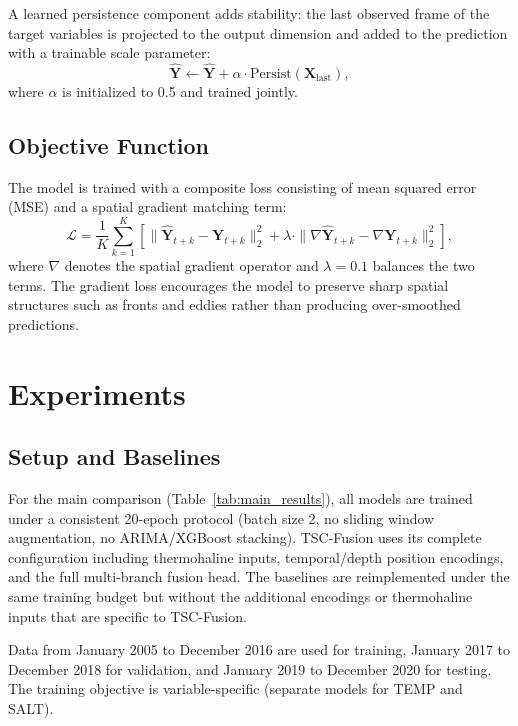 \documentclass[conference]{IEEEtran}
\begin{document}
A learned persistence component adds stability: the last observed frame of the target variables is projected to the output dimension and added to the prediction with a trainable scale parameter:
\begin{equation}
\hat{\mathbf{Y}} \leftarrow \hat{\mathbf{Y}} + \alpha \cdot \text{Persist}(\mathbf{X}_{\text{last}}),
\end{equation}
where $\alpha$ is initialized to 0.5 and trained jointly.

\subsection{Objective Function}

The model is trained with a composite loss consisting of mean squared error (MSE) and a spatial gradient matching term:
\begin{equation}
\mathcal{L} = \frac{1}{K} \sum_{k=1}^{K} \left[ \|\hat{\mathbf{Y}}_{t+k} - \mathbf{Y}_{t+k}\|_2^2 + \lambda \cdot \|\nabla \hat{\mathbf{Y}}_{t+k} - \nabla \mathbf{Y}_{t+k}\|_2^2 \right],
\end{equation}
where $\nabla$ denotes the spatial gradient operator and $\lambda=0.1$ balances the two terms. The gradient loss encourages the model to preserve sharp spatial structures such as fronts and eddies rather than producing over-smoothed predictions.

\section{Experiments}

\subsection{Setup and Baselines}

For the main comparison (Table~\ref{tab:main_results}), all models are trained under a consistent 20-epoch protocol (batch size 2, no sliding window augmentation, no ARIMA/XGBoost stacking). TSC-Fusion uses its complete configuration including thermohaline inputs, temporal/depth position encodings, and the full multi-branch fusion head. The baselines are reimplemented under the same training budget but without the additional encodings or thermohaline inputs that are specific to TSC-Fusion.

Data from January 2005 to December 2016 are used for training, January 2017 to December 2018 for validation, and January 2019 to December 2020 for testing. The training objective is variable-specific (separate models for TEMP and SALT).
\end{document}
